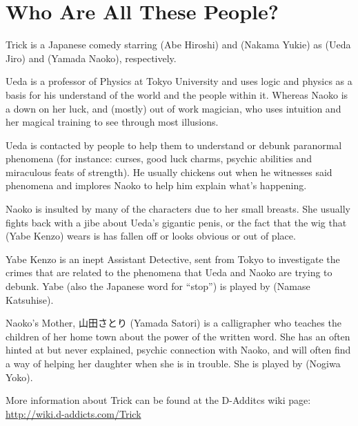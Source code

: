 \section*{Who Are All These People?}

Trick is a Japanese comedy starring  (Abe Hiroshi) and  (Nakama Yukie) as  (Ueda Jiro) and  (Yamada Naoko), respectively.

\par Ueda is a professor of Physics at Tokyo University and uses logic and physics as a basis for his understand of the world and the people within it. Whereas Naoko is a down on her luck, and (mostly) out of work magician, who uses intuition and her magical training to see through most illusions.

\par Ueda is contacted by people to help them to understand or debunk paranormal phenomena (for instance: curses, good luck charms, psychic abilities and miraculous feats of strength). He usually chickens out when he witnesses said phenomena and implores Naoko to help him explain what's happening.

\par Naoko is insulted by many of the characters due to her small breasts. She usually fights back with a jibe about Ueda's gigantic penis, or the fact that the wig that  (Yabe Kenzo) wears is has fallen off or looks obvious or out of place.

\par Yabe Kenzo is an inept Assistant Detective, sent from Tokyo to investigate the crimes that are related to the phenomena that Ueda and Naoko are trying to debunk. Yabe (also the Japanese word for ``stop'') is played by  (Namase Katsuhise).

\par Naoko's Mother, 山田さとり (Yamada Satori) is a calligrapher who teaches the children of her home town about the power of the written word. She has an often hinted at but never explained, psychic connection with Naoko, and will often find a way of helping her daughter when she is in trouble. She is played by  (Nogiwa Yoko).

\par More information about Trick can be found at the D-Additcs wiki page: \url{http://wiki.d-addicts.com/Trick}